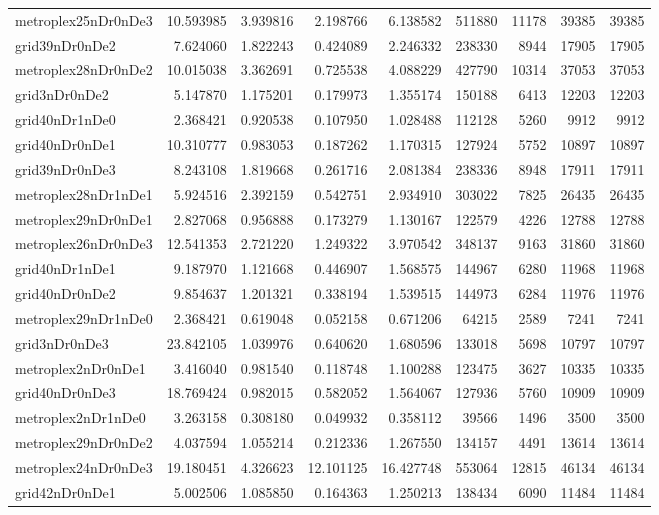 \begin{longtable}{|l|r|r|r|r|r|r|r|r|}
metroplex25nDr0nDe3 & 10.593985 & 3.939816 & 2.198766 & 6.138582 & 511880 & 11178 & 39385 & 39385 \\
grid39nDr0nDe2 & 7.624060 & 1.822243 & 0.424089 & 2.246332 & 238330 & 8944 & 17905 & 17905 \\
metroplex28nDr0nDe2 & 10.015038 & 3.362691 & 0.725538 & 4.088229 & 427790 & 10314 & 37053 & 37053 \\
grid3nDr0nDe2 & 5.147870 & 1.175201 & 0.179973 & 1.355174 & 150188 & 6413 & 12203 & 12203 \\
grid40nDr1nDe0 & 2.368421 & 0.920538 & 0.107950 & 1.028488 & 112128 & 5260 & 9912 & 9912 \\
grid40nDr0nDe1 & 10.310777 & 0.983053 & 0.187262 & 1.170315 & 127924 & 5752 & 10897 & 10897 \\
grid39nDr0nDe3 & 8.243108 & 1.819668 & 0.261716 & 2.081384 & 238336 & 8948 & 17911 & 17911 \\
metroplex28nDr1nDe1 & 5.924516 & 2.392159 & 0.542751 & 2.934910 & 303022 & 7825 & 26435 & 26435 \\
metroplex29nDr0nDe1 & 2.827068 & 0.956888 & 0.173279 & 1.130167 & 122579 & 4226 & 12788 & 12788 \\
metroplex26nDr0nDe3 & 12.541353 & 2.721220 & 1.249322 & 3.970542 & 348137 & 9163 & 31860 & 31860 \\
grid40nDr1nDe1 & 9.187970 & 1.121668 & 0.446907 & 1.568575 & 144967 & 6280 & 11968 & 11968 \\
grid40nDr0nDe2 & 9.854637 & 1.201321 & 0.338194 & 1.539515 & 144973 & 6284 & 11976 & 11976 \\
metroplex29nDr1nDe0 & 2.368421 & 0.619048 & 0.052158 & 0.671206 & 64215 & 2589 & 7241 & 7241 \\
grid3nDr0nDe3 & 23.842105 & 1.039976 & 0.640620 & 1.680596 & 133018 & 5698 & 10797 & 10797 \\
metroplex2nDr0nDe1 & 3.416040 & 0.981540 & 0.118748 & 1.100288 & 123475 & 3627 & 10335 & 10335 \\
grid40nDr0nDe3 & 18.769424 & 0.982015 & 0.582052 & 1.564067 & 127936 & 5760 & 10909 & 10909 \\
metroplex2nDr1nDe0 & 3.263158 & 0.308180 & 0.049932 & 0.358112 & 39566 & 1496 & 3500 & 3500 \\
metroplex29nDr0nDe2 & 4.037594 & 1.055214 & 0.212336 & 1.267550 & 134157 & 4491 & 13614 & 13614 \\
metroplex24nDr0nDe3 & 19.180451 & 4.326623 & 12.101125 & 16.427748 & 553064 & 12815 & 46134 & 46134 \\
grid42nDr0nDe1 & 5.002506 & 1.085850 & 0.164363 & 1.250213 & 138434 & 6090 & 11484 & 11484 \\

\end{longtable}
